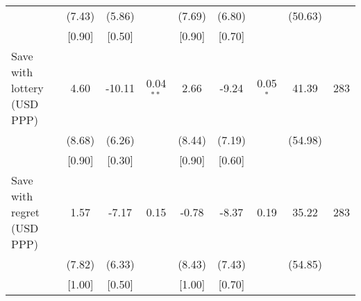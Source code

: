 \begin{table}[h]
{\begin{threeparttable}
\begin{tabular}{l*{8}{c}}
          &   (7.43)&   (5.86)&         &   (7.69)&   (6.80)&         &  (50.63)&         \\
          &   [0.90]&   [0.50]&         &   [0.90]&   [0.70]&         &         &         \\
Save with lottery (USD PPP)&     4.60&   -10.11&0.04$^{**}$&     2.66&    -9.24&0.05$^{*}$&    41.39&      283\\
          &   (8.68)&   (6.26)&         &   (8.44)&   (7.19)&         &  (54.98)&         \\
          &   [0.90]&   [0.30]&         &   [0.90]&   [0.60]&         &         &         \\
Save with regret (USD PPP)&     1.57&    -7.17&     0.15&    -0.78&    -8.37&     0.19&    35.22&      283\\
          &   (7.82)&   (6.33)&         &   (8.43)&   (7.43)&         &  (54.85)&         \\
          &   [1.00]&   [0.50]&         &   [1.00]&   [0.70]&         &         &         \\
\bottomrule \end{tabular} \begin{tablenotes}[flushleft] \footnotesize \item  \end{tablenotes} \end{threeparttable} } \end{table}
